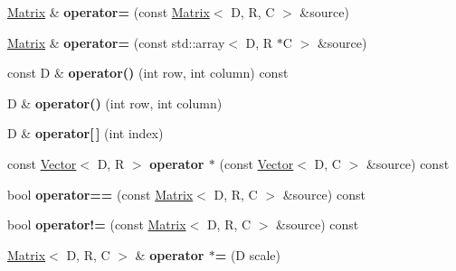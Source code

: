 \begin{DoxyCompactItemize}
\item 
\mbox{\label{classrev_1_1_matrix_aa6418d0e275104b994586dd320db559e}} 
\mbox{\hyperlink{classrev_1_1_matrix}{Matrix}} \& {\bfseries operator=} (const \mbox{\hyperlink{classrev_1_1_matrix}{Matrix}}$<$ D, R, C $>$ \&source)
\item 
\mbox{\label{classrev_1_1_matrix_acbc3980c84732236d5c026351d146088}} 
\mbox{\hyperlink{classrev_1_1_matrix}{Matrix}} \& {\bfseries operator=} (const std\+::array$<$ D, R $\ast$C $>$ \&source)
\item 
\mbox{\label{classrev_1_1_matrix_ac3a4426617041d54a5900f0db122fcd1}} 
const D \& {\bfseries operator()} (int row, int column) const
\item 
\mbox{\label{classrev_1_1_matrix_a7e72360901e54d0bbcd0475d89513a2d}} 
D \& {\bfseries operator()} (int row, int column)
\item 
\mbox{\label{classrev_1_1_matrix_ae4645d33621e20dba66777624e269bb3}} 
D \& {\bfseries operator\mbox{[}$\,$\mbox{]}} (int index)
\item 
\mbox{\label{classrev_1_1_matrix_ae28c7f193b02d96adf50f949fa7d2033}} 
const \mbox{\hyperlink{classrev_1_1_vector}{Vector}}$<$ D, R $>$ {\bfseries operator $\ast$} (const \mbox{\hyperlink{classrev_1_1_vector}{Vector}}$<$ D, C $>$ \&source) const
\item 
\mbox{\label{classrev_1_1_matrix_a9c4e5b52a547f41bdf0df31af9da96bc}} 
bool {\bfseries operator==} (const \mbox{\hyperlink{classrev_1_1_matrix}{Matrix}}$<$ D, R, C $>$ \&source) const
\item 
\mbox{\label{classrev_1_1_matrix_aef06255f76028255c4121ee04351c5a6}} 
bool {\bfseries operator!=} (const \mbox{\hyperlink{classrev_1_1_matrix}{Matrix}}$<$ D, R, C $>$ \&source) const
\item 
\mbox{\label{classrev_1_1_matrix_a80b357b6947037824719712e671e1d2b}} 
\mbox{\hyperlink{classrev_1_1_matrix}{Matrix}}$<$ D, R, C $>$ \& {\bfseries operator $\ast$=} (D scale)

\end{DoxyCompactItemize}
